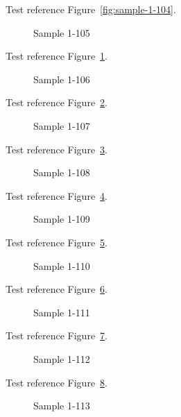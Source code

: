 Test reference Figure~\ref{fig:sample-1-104}.

\begin{figure}[tbhp]
\caption{Sample 1-105}
\label{fig:sample-1-105}
\end{figure}

Test reference Figure~\ref{fig:sample-1-105}.

\begin{figure}[tbhp]
\caption{Sample 1-106}
\label{fig:sample-1-106}
\end{figure}

Test reference Figure~\ref{fig:sample-1-106}.

\begin{figure}[tbhp]
\caption{Sample 1-107}
\label{fig:sample-1-107}
\end{figure}

Test reference Figure~\ref{fig:sample-1-107}.

\begin{figure}[tbhp]
\caption{Sample 1-108}
\label{fig:sample-1-108}
\end{figure}

Test reference Figure~\ref{fig:sample-1-108}.

\begin{figure}[tbhp]
\caption{Sample 1-109}
\label{fig:sample-1-109}
\end{figure}

Test reference Figure~\ref{fig:sample-1-109}.

\begin{figure}[tbhp]
\caption{Sample 1-110}
\label{fig:sample-1-110}
\end{figure}

Test reference Figure~\ref{fig:sample-1-110}.

\begin{figure}[tbhp]
\caption{Sample 1-111}
\label{fig:sample-1-111}
\end{figure}

Test reference Figure~\ref{fig:sample-1-111}.

\begin{figure}[tbhp]
\caption{Sample 1-112}
\label{fig:sample-1-112}
\end{figure}

Test reference Figure~\ref{fig:sample-1-112}.

\begin{figure}[tbhp]
\caption{Sample 1-113}
\label{fig:sample-1-113}
\end{figure}

